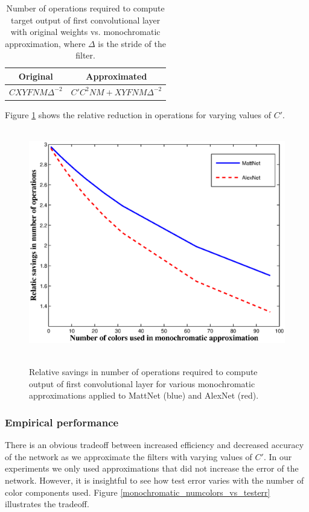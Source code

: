 \begin{table}[h]
\tiny
\parbox{\linewidth}{
\centering
\begin{tabular}{cc}
\hline
Original & Approximated \\
\hline
$C X Y F N M \Delta^{-2}$  & $	 C' C^2 N M + X Y F N M \Delta^{-2}$\\
\hline
\end{tabular}
\caption{Number of operations required to compute target output of first convolutional layer with original weights vs. monochromatic approximation, where $\Delta$ is the stride of the filter.}
\label{monochromatic_ops}
}
\end{table}

Figure \ref{monochromatic_ops_pic} shows the relative reduction in operations for varying values of $C'$.

\begin{figure}[t]
\centering
\mbox{
  \includegraphics[width=0.75\linewidth]{img/monochromatic_numcolors_vs_numops.eps} 
}
\label{monochromatic_ops_pic}
\caption{Relative savings in number of operations required to compute output of first convolutional layer for various monochromatic approximations applied to MattNet (blue) and AlexNet (red).}
\end{figure}

\subsubsection{Empirical performance}
There is an obvious tradeoff between increased efficiency and decreased accuracy of the network as we approximate the filters with varying values of $C'$. In our experiments we only used approximations that did not increase the error of the network. However, it is insightful to see how test error varies with the number of color components used. Figure \ref{monochromatic_numcolors_vs_testerr} illustrates the tradeoff.

